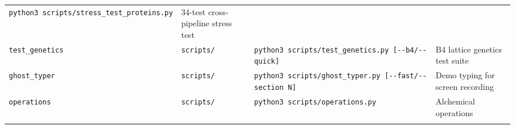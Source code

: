 \begin{longtable}[]{@{}llll@{}}
\begin{minipage}[t]{0.19\columnwidth}
\texttt{python3\ scripts/stress\_test\_proteins.py}\strut
\end{minipage} & \begin{minipage}[t]{0.28\columnwidth}\raggedright
34-test cross-pipeline stress test\strut
\end{minipage}\tabularnewline
\begin{minipage}[t]{0.17\columnwidth}\raggedright
\texttt{test\_genetics}\strut
\end{minipage} & \begin{minipage}[t]{0.24\columnwidth}\raggedright
\texttt{scripts/}\strut
\end{minipage} & \begin{minipage}[t]{0.19\columnwidth}\raggedright
\texttt{python3\ scripts/test\_genetics.py\ {[}-\/-b4/-\/-quick{]}}\strut
\end{minipage} & \begin{minipage}[t]{0.28\columnwidth}\raggedright
B4 lattice genetics test suite\strut
\end{minipage}\tabularnewline
\begin{minipage}[t]{0.17\columnwidth}\raggedright
\texttt{ghost\_typer}\strut
\end{minipage} & \begin{minipage}[t]{0.24\columnwidth}\raggedright
\texttt{scripts/}\strut
\end{minipage} & \begin{minipage}[t]{0.19\columnwidth}\raggedright
\texttt{python3\ scripts/ghost\_typer.py\ {[}-\/-fast/-\/-section\ N{]}}\strut
\end{minipage} & \begin{minipage}[t]{0.28\columnwidth}\raggedright
Demo typing for screen recording\strut
\end{minipage}\tabularnewline
\begin{minipage}[t]{0.17\columnwidth}\raggedright
\texttt{operations}\strut
\end{minipage} & \begin{minipage}[t]{0.24\columnwidth}\raggedright
\texttt{scripts/}\strut
\end{minipage} & \begin{minipage}[t]{0.19\columnwidth}\raggedright
\texttt{python3\ scripts/operations.py}\strut
\end{minipage} & \begin{minipage}[t]{0.28\columnwidth}\raggedright
Alchemical operations\strut
\end{minipage}\tabularnewline
\begin{minipage}[t]{0.17\columnwidth}\raggedright

\end{minipage}
\end{longtable}
